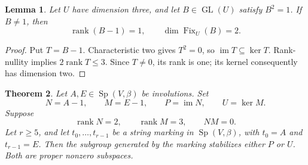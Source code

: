 \documentclass[11pt]{article}
\newtheorem{theorem}{Theorem}
\newtheorem{lemma}[theorem]{Lemma}
\newcommand{\im}{\operatorname{im}}
\newcommand{\Fix}{\operatorname{Fix}}
\newcommand{\Sp}{\operatorname{Sp}}
\begin{document}
\begin{lemma}\label{lem:three}
Let \(U\) have dimension three, and let \(B\in\operatorname{GL}(U)\)
satisfy \(B^2=1\). If \(B\ne1\), then
\[
       \operatorname{rank}(B-1)=1,\qquad \dim\Fix_U(B)=2.
\]
\end{lemma}
\begin{proof}
Put \(T=B-1\). Characteristic two gives \(T^2=0\), so
\(\im T\subseteq\ker T\). Rank-nullity implies
\(2\operatorname{rank}T\leq3\). Since \(T\ne0\), its rank is one;
its kernel consequently has dimension two.
\end{proof}

\begin{theorem}\label{thm:endpoints}
Let \(A,E\in\Sp(V,\beta)\) be involutions. Set
\[
       N=A-1,\qquad M=E-1,\qquad
       P=\im N,\qquad U=\ker M.
\]
Suppose
\[
        \operatorname{rank}N=2,\qquad
        \operatorname{rank}M=3,\qquad NM=0.             \tag{1}
\]
Let \(r\geq5\), and let \(t_0,\ldots,t_{r-1}\) be a string marking
in \(\Sp(V,\beta)\), with \(t_0=A\) and \(t_{r-1}=E\).
Then the subgroup generated by the marking stabilizes either \(P\)
or \(U\). Both are proper nonzero subspaces.
\end{theorem}
\end{document}
